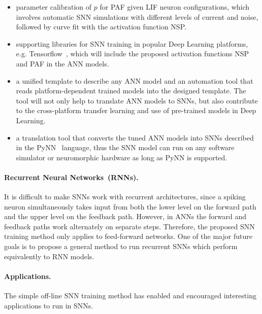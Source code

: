 \begin{itemize}
	\item parameter calibration of $p$ for PAF given LIF neuron configurations, which involves automatic SNN simulations with different levels of current and noise, followed by curve fit with the activation function NSP. 
	
	\item supporting libraries for SNN training in popular Deep Learning platforms, e.g. Tensorflow~\citep{tensorflow2015-whitepaper}, which will include the proposed activation functions NSP and PAF in the ANN models.
	
	\item a unified template to describe any ANN model and an automation tool that reads platform-dependent trained models into the designed template.
	The tool will not only help to translate ANN models to SNNs, but also contribute to the cross-platform transfer learning and use of pre-trained models in Deep Learning.
	
	\item a translation tool that converts the tuned ANN models into SNNs described in the PyNN~\citep{davison2008pynn} language, thus the SNN model can run on any software simulator or neuromorphic hardware as long as PyNN is supported.
\end{itemize}

\paragraph{Recurrent Neural Networks~(RNNs).}
It is difficult to make SNNs work with recurrent architectures, since a spiking neuron simultaneously takes input from both the lower level on the forward path and the upper level on the feedback path.
However, in ANNs the forward and feedback paths work alternately on separate steps.
Therefore, the proposed SNN training method only applies to feed-forward networks.
One of the major future goals is to propose a general method to run recurrent SNNs which perform equivalently to RNN models.

\paragraph{Applications.}
The simple off-line SNN training method has enabled and encouraged interesting applications to run in SNNs.

